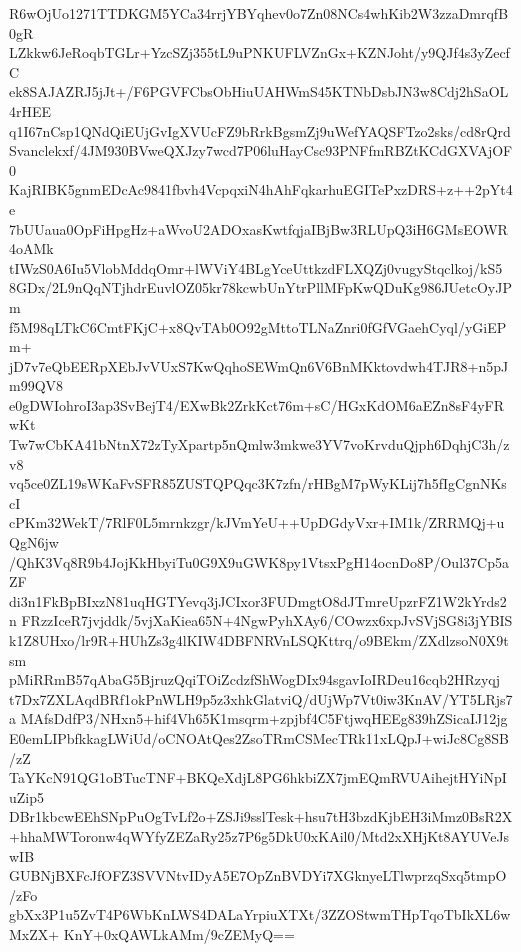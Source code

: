 R6wOjUo1271TTDKGM5YCa34rrjYBYqhev0o7Zn08NCs4whKib2W3zzaDmrqfB0gR
LZkkw6JeRoqbTGLr+YzcSZj355tL9uPNKUFLVZnGx+KZNJoht/y9QJf4s3yZecfC
ek8SAJAZRJ5jJt+/F6PGVFCbsObHiuUAHWmS45KTNbDsbJN3w8Cdj2hSaOL4rHEE
q1I67nCsp1QNdQiEUjGvIgXVUcFZ9bRrkBgsmZj9uWefYAQSFTzo2sks/cd8rQrd
Svanclekxf/4JM930BVweQXJzy7wcd7P06luHayCsc93PNFfmRBZtKCdGXVAjOF0
KajRIBK5gnmEDcAc9841fbvh4VcpqxiN4hAhFqkarhuEGITePxzDRS+z++2pYt4e
7bUUaua0OpFiHpgHz+aWvoU2ADOxasKwtfqjaIBjBw3RLUpQ3iH6GMsEOWR4oAMk
tIWzS0A6Iu5VlobMddqOmr+lWViY4BLgYceUttkzdFLXQZj0vugyStqclkoj/kS5
8GDx/2L9nQqNTjhdrEuvlOZ05kr78kcwbUnYtrPllMFpKwQDuKg986JUetcOyJPm
f5M98qLTkC6CmtFKjC+x8QvTAb0O92gMttoTLNaZnri0fGfVGaehCyql/yGiEPm+
jD7v7eQbEERpXEbJvVUxS7KwQqhoSEWmQn6V6BnMKktovdwh4TJR8+n5pJm99QV8
e0gDWIohroI3ap3SvBejT4/EXwBk2ZrkKct76m+sC/HGxKdOM6aEZn8sF4yFRwKt
Tw7wCbKA41bNtnX72zTyXpartp5nQmlw3mkwe3YV7voKrvduQjph6DqhjC3h/zv8
vq5ce0ZL19sWKaFvSFR85ZUSTQPQqc3K7zfn/rHBgM7pWyKLij7h5fIgCgnNKscI
cPKm32WekT/7RlF0L5mrnkzgr/kJVmYeU++UpDGdyVxr+IM1k/ZRRMQj+uQgN6jw
/QhK3Vq8R9b4JojKkHbyiTu0G9X9uGWK8py1VtsxPgH14ocnDo8P/Oul37Cp5aZF
di3n1FkBpBIxzN81uqHGTYevq3jJCIxor3FUDmgtO8dJTmreUpzrFZ1W2kYrds2n
FRzzIceR7jvjddk/5vjXaKiea65N+4NgwPyhXAy6/COwzx6xpJvSVjSG8i3jYBIS
k1Z8UHxo/lr9R+HUhZs3g4lKIW4DBFNRVnLSQKttrq/o9BEkm/ZXdlzsoN0X9tsm
pMiRRmB57qAbaG5BjruzQqiTOiZcdzfShWogDIx94sgavIoIRDeu16cqb2HRzyqj
t7Dx7ZXLAqdBRf1okPnWLH9p5z3xhkGlatviQ/dUjWp7Vt0iw3KnAV/YT5LRjs7a
MAfsDdfP3/NHxn5+hif4Vh65K1msqrm+zpjbf4C5FtjwqHEEg839hZSicaIJ12jg
E0emLIPbfkkagLWiUd/oCNOAtQes2ZsoTRmCSMecTRk11xLQpJ+wiJc8Cg8SB/zZ
TaYKcN91QG1oBTucTNF+BKQeXdjL8PG6hkbiZX7jmEQmRVUAihejtHYiNpIuZip5
DBr1kbcwEEhSNpPuOgTvLf2o+ZSJi9sslTesk+hsu7tH3bzdKjbEH3iMmz0BsR2X
+hhaMWToronw4qWYfyZEZaRy25z7P6g5DkU0xKAil0/Mtd2xXHjKt8AYUVeJswIB
GUBNjBXFcJfOFZ3SVVNtvIDyA5E7OpZnBVDYi7XGknyeLTlwprzqSxq5tmpO/zFo
gbXx3P1u5ZvT4P6WbKnLWS4DALaYrpiuXTXt/3ZZOStwmTHpTqoTbIkXL6wMxZX+
KnY+0xQAWLkAMm/9cZEMyQ==
